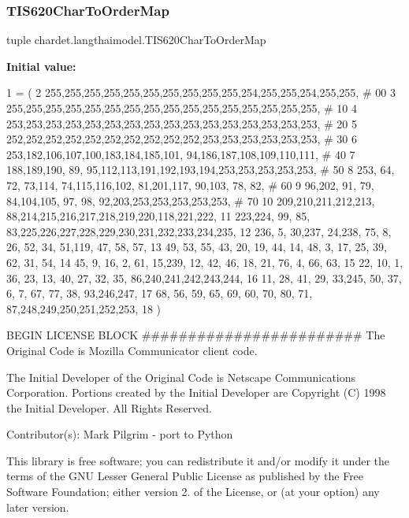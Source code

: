 \subsubsection{\texorpdfstring{T\+I\+S620\+Char\+To\+Order\+Map}{TIS620CharToOrderMap}}
{\footnotesize\ttfamily tuple chardet.\+langthaimodel.\+T\+I\+S620\+Char\+To\+Order\+Map}

{\bfseries Initial value\+:}
\begin{DoxyCode}
1 =  (
2 255,255,255,255,255,255,255,255,255,255,254,255,255,254,255,255,  \textcolor{comment}{# 00}
3 255,255,255,255,255,255,255,255,255,255,255,255,255,255,255,255,  \textcolor{comment}{# 10}
4 253,253,253,253,253,253,253,253,253,253,253,253,253,253,253,253,  \textcolor{comment}{# 20}
5 252,252,252,252,252,252,252,252,252,252,253,253,253,253,253,253,  \textcolor{comment}{# 30}
6 253,182,106,107,100,183,184,185,101, 94,186,187,108,109,110,111,  \textcolor{comment}{# 40}
7 188,189,190, 89, 95,112,113,191,192,193,194,253,253,253,253,253,  \textcolor{comment}{# 50}
8 253, 64, 72, 73,114, 74,115,116,102, 81,201,117, 90,103, 78, 82,  \textcolor{comment}{# 60}
9  96,202, 91, 79, 84,104,105, 97, 98, 92,203,253,253,253,253,253,  \textcolor{comment}{# 70}
10 209,210,211,212,213, 88,214,215,216,217,218,219,220,118,221,222,
11 223,224, 99, 85, 83,225,226,227,228,229,230,231,232,233,234,235,
12 236,  5, 30,237, 24,238, 75,  8, 26, 52, 34, 51,119, 47, 58, 57,
13  49, 53, 55, 43, 20, 19, 44, 14, 48,  3, 17, 25, 39, 62, 31, 54,
14  45,  9, 16,  2, 61, 15,239, 12, 42, 46, 18, 21, 76,  4, 66, 63,
15  22, 10,  1, 36, 23, 13, 40, 27, 32, 35, 86,240,241,242,243,244,
16  11, 28, 41, 29, 33,245, 50, 37,  6,  7, 67, 77, 38, 93,246,247,
17  68, 56, 59, 65, 69, 60, 70, 80, 71, 87,248,249,250,251,252,253,
18 )
\end{DoxyCode}


B\+E\+G\+IN L\+I\+C\+E\+N\+SE B\+L\+O\+CK \#\#\#\#\#\#\#\#\#\#\#\#\#\#\#\#\#\#\#\#\#\#\#\# The Original Code is Mozilla Communicator client code. 

The Initial Developer of the Original Code is Netscape Communications Corporation. Portions created by the Initial Developer are Copyright (C) 1998 the Initial Developer. All Rights Reserved.

Contributor(s)\+: Mark Pilgrim -\/ port to Python

This library is free software; you can redistribute it and/or modify it under the terms of the G\+NU Lesser General Public License as published by the Free Software Foundation; either version 2. of the License, or (at your option) any later version.

